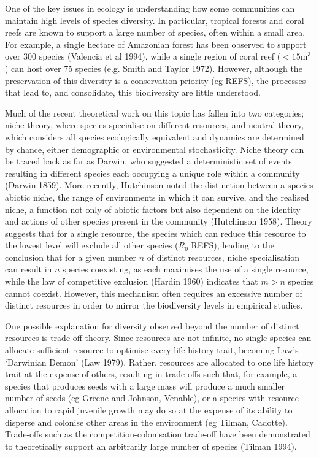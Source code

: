 
One of the key issues in ecology is understanding how some communities can maintain high levels of species diversity. In particular, tropical forests and coral reefs are known to support a large number of species, often within a small area. For example, a single hectare of Amazonian forest has been observed to support over 300 species (Valencia et al 1994), while a single region of coral reef ($<15$m$^3$) can host over 75 species (e.g. Smith and Taylor 1972). However, although the preservation of this diversity is a conservation priority (eg REFS), the processes that lead to, and consolidate, this biodiversity are little understood.

Much of the recent theoretical work on this topic has fallen into two categories; niche theory, where species specialise on different resources, and neutral theory, which considers all species ecologically equivalent and dynamics are determined by chance, either demographic or environmental stochasticity. Niche theory can be traced back as far as Darwin, who suggested a deterministic set of events resulting in different species each occupying a unique role within a community (Darwin 1859). More recently, Hutchinson noted the distinction between a species abiotic niche, the range of environments in which it can survive, and the realised niche, a function not only of abiotic factors but also dependent on the identity and actions of other species present in the community (Hutchinson 1958). Theory suggests that for a single resource, the species which can reduce this resource to the lowest level will exclude all other species ($R_0$ REFS), leading to the conclusion that for a given number $n$ of distinct resources, niche specialisation can result in $n$ species coexisting, as each maximises the use of a single resource, while the law of competitive exclusion (Hardin 1960) indicates that $m>n$ species cannot coexist. However, this mechanism often requires an excessive number of distinct resources in order to mirror the biodiversity levels in empirical studies.

 One possible explanation for diversity observed beyond the number of distinct resources is trade-off theory. Since resources are not infinite, no single species can allocate sufficient resource to optimise every life history trait, becoming Law's `Darwinian Demon' (Law 1979). Rather, resources are allocated to one life history trait  at the expense of others, resulting in trade-offs such that, for example, a species that produces seeds with a large mass will produce a much smaller number of seeds (eg Greene and Johnson, Venable), or a species with resource allocation to rapid juvenile growth may do so at the expense of its ability to disperse and colonise other areas in the environment (eg Tilman, Cadotte). Trade-offs such as the competition-colonisation trade-off have been demonstrated to theoretically support an arbitrarily large number of species (Tilman 1994).
 
